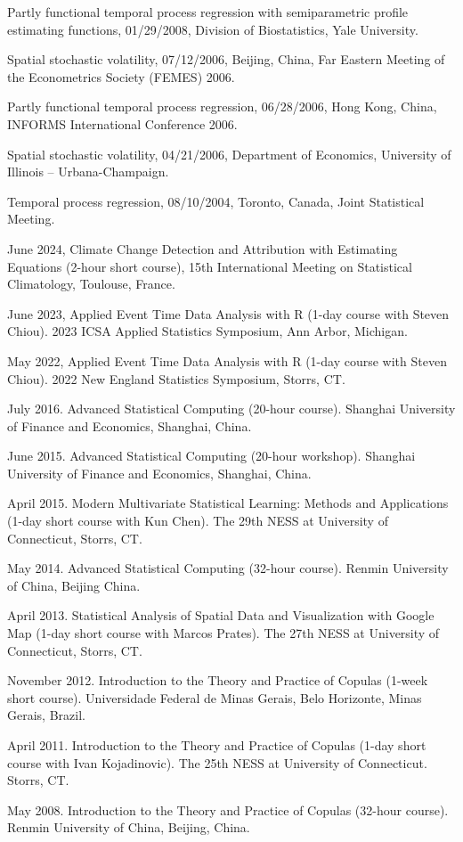 \documentclass[Statistics]{vita}
\begin{document}
\begin{vita}
\begin{InvitedTalks}
  \item Partly functional temporal process regression with semiparametric profile estimating functions, 01/29/2008, Division of Biostatistics, Yale University.
  \item Spatial stochastic volatility, 07/12/2006, Beijing, China, Far Eastern Meeting of the Econometrics Society (FEMES) 2006.
  \item Partly functional temporal process regression, 06/28/2006, Hong Kong, China, INFORMS International Conference 2006.
  \item Spatial stochastic volatility, 04/21/2006, Department of Economics, University of Illinois -- Urbana-Champaign.
  \item Temporal process regression, 08/10/2004, Toronto, Canada, Joint Statistical Meeting.
  \end{InvitedTalks}
  \begin{InvitedWorkshops}
  \item June 2024, Climate Change Detection and Attribution with Estimating Equations (2-hour short course), 15th International Meeting on Statistical Climatology, Toulouse, France.
  \item June 2023, Applied Event Time Data Analysis with R (1-day course with Steven Chiou). 2023 ICSA Applied Statistics Symposium, Ann Arbor, Michigan.
  \item May 2022, Applied Event Time Data Analysis with R (1-day course with Steven Chiou). 2022 New England Statistics Symposium, Storrs, CT.
  \item July 2016. Advanced Statistical Computing (20-hour course). Shanghai University of Finance and Economics, Shanghai, China.
  \item June 2015. Advanced Statistical Computing (20-hour workshop). Shanghai University of Finance and Economics, Shanghai, China.
  \item April 2015. Modern Multivariate Statistical Learning: Methods and Applications (1-day short course with Kun Chen). The 29th NESS at University of Connecticut, Storrs, CT.
  \item May 2014. Advanced Statistical Computing (32-hour course). Renmin University of China, Beijing China.
  \item April 2013. Statistical Analysis of Spatial Data and Visualization with Google Map (1-day short course with Marcos Prates). The 27th NESS at University of Connecticut, Storrs, CT.
  \item November 2012. Introduction to the Theory and Practice of Copulas (1-week short course). Universidade Federal de Minas Gerais, Belo Horizonte, Minas Gerais, Brazil.
  \item April 2011. Introduction to the Theory and Practice of Copulas (1-day short course with Ivan Kojadinovic). The 25th NESS at University of Connecticut. Storrs, CT.
  \item May 2008. Introduction to the Theory and Practice of Copulas (32-hour course). Renmin University of China, Beijing, China.
  \end{InvitedWorkshops}

\end{vita}
\end{document}
